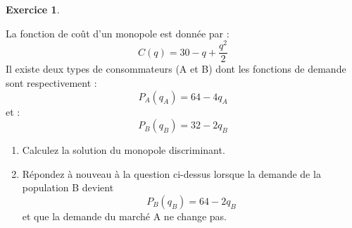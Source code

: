 \documentclass[
]{book}
\providecommand{\tightlist}{%
  \setlength{\itemsep}{0pt}\setlength{\parskip}{0pt}}
\theoremstyle{definition}
\theoremstyle{definition}
\theoremstyle{definition}
\newtheorem{exercise}{Exercice}[chapter]
\theoremstyle{definition}
\theoremstyle{remark}
\begin{document}
\begin{exercise}
\protect\hypertarget{exr:discriminationexo3}{}\label{exr:discriminationexo3}

La fonction de coût d'un monopole est donnée par :
\[C(q)=30-q+\frac{q^2}{2}\] Il existe deux types de consommateurs (A et
B) dont les fonctions de demande sont respectivement :
\[P_{A}(q_{A})=64-4q_{A}\] et : \[P_{B}(q_{B})=32-2q_{B}\]

\begin{enumerate}
\def\labelenumi{\arabic{enumi}.}
\tightlist
\item
  Calculez la solution du monopole discriminant.
\item
  Répondez à nouveau à la question ci-dessus lorsque la
  demande de la population B devient \[P_{B}(q_{B})=64-2q_{B}\] et que
  la demande du marché A ne change pas.
\end{enumerate}

\end{exercise}
\end{document}
